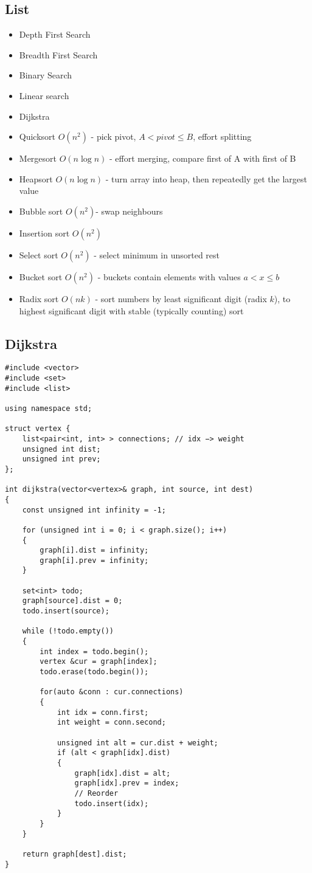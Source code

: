 \documentclass[10pt]{article}
\begin{document}
\subsection{List}
\begin{itemize}
\item Depth First Search
\item Breadth First Search
\item Binary Search
\item Linear search
\item Dijkstra
\item Quicksort $O(n^2)$ - pick pivot, $A<pivot \leq B$, effort splitting
\item Mergesort $O(n \log n)$ - effort merging, compare first of A with first of B
\item Heapsort $O(n \log n)$ - turn array into heap, then repeatedly get the largest value
\item Bubble sort $O(n^2)$- swap neighbours
\item Insertion sort $O(n^2)$
\item Select sort $O(n^2)$ - select minimum in unsorted rest
\item Bucket sort $O(n^2)$ - buckets contain elements with values $a < x \leq b$
\item Radix sort $O(nk)$ - sort numbers by least significant digit (radix $k$), to highest significant digit with stable (typically counting) sort
\end{itemize}

\subsection{Dijkstra}
\begin{lstlisting}
#include <vector>
#include <set>
#include <list>

using namespace std;

struct vertex {
	list<pair<int, int> > connections; // idx −> weight
	unsigned int dist;
	unsigned int prev;
};

int dijkstra(vector<vertex>& graph, int source, int dest)
{
	const unsigned int infinity = -1;

	for (unsigned int i = 0; i < graph.size(); i++)
	{
		graph[i].dist = infinity;
		graph[i].prev = infinity;
	}

	set<int> todo;
	graph[source].dist = 0;
	todo.insert(source);

	while (!todo.empty())
	{
		int index = todo.begin();
		vertex &cur = graph[index];
		todo.erase(todo.begin());

		for(auto &conn : cur.connections)
		{
			int idx = conn.first;
			int weight = conn.second;

			unsigned int alt = cur.dist + weight;
			if (alt < graph[idx].dist)
			{
				graph[idx].dist = alt;
				graph[idx].prev = index;
				// Reorder
				todo.insert(idx);
			}
		}
	}

	return graph[dest].dist;
}
\end{lstlisting}
\end{document}
